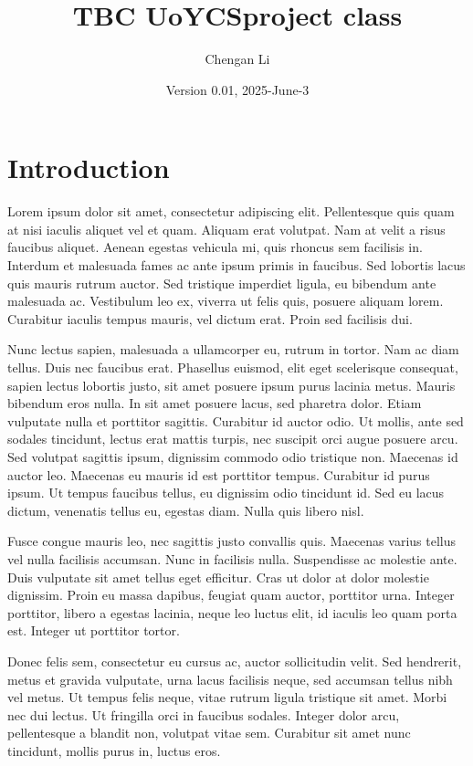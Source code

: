 \documentclass{UoYCSproject}
\author{Chengan Li}
\title{TBC
\textsf{UoYCSproject} class}
\date{Version 0.01, 2025-June-3}
\begin{document}
\maketitle
\listoffigures
\listoftables


\chapter{Introduction}
\label{cha:Introduction}
Lorem ipsum dolor sit amet, consectetur adipiscing elit. Pellentesque
quis quam at nisi iaculis aliquet vel et quam. Aliquam erat
volutpat. Nam at velit a risus faucibus aliquet. Aenean egestas
vehicula mi, quis rhoncus sem facilisis in. Interdum et malesuada
fames ac ante ipsum primis in faucibus. Sed lobortis lacus quis mauris
rutrum auctor. Sed tristique imperdiet ligula, eu bibendum ante
malesuada ac. Vestibulum leo ex, viverra ut felis quis, posuere
aliquam lorem. Curabitur iaculis tempus mauris, vel dictum erat. Proin
sed facilisis dui.

Nunc lectus sapien, malesuada a ullamcorper eu, rutrum in tortor. Nam
ac diam tellus. Duis nec faucibus erat. Phasellus euismod, elit eget
scelerisque consequat, sapien lectus lobortis justo, sit amet posuere
ipsum purus lacinia metus. Mauris bibendum eros nulla. In sit amet
posuere lacus, sed pharetra dolor. Etiam vulputate nulla et porttitor
sagittis. Curabitur id auctor odio. Ut mollis, ante sed sodales
tincidunt, lectus erat mattis turpis, nec suscipit orci augue posuere
arcu. Sed volutpat sagittis ipsum, dignissim commodo odio tristique
non. Maecenas id auctor leo. Maecenas eu mauris id est porttitor
tempus. Curabitur id purus ipsum. Ut tempus faucibus tellus, eu
dignissim odio tincidunt id. Sed eu lacus dictum, venenatis tellus eu,
egestas diam. Nulla quis libero nisl.

Fusce congue mauris leo, nec sagittis justo convallis quis. Maecenas
varius tellus vel nulla facilisis accumsan. Nunc in facilisis
nulla. Suspendisse ac molestie ante. Duis vulputate sit amet tellus
eget efficitur. Cras ut dolor at dolor molestie dignissim. Proin eu
massa dapibus, feugiat quam auctor, porttitor urna. Integer porttitor,
libero a egestas lacinia, neque leo luctus elit, id iaculis leo quam
porta est. Integer ut porttitor tortor.

Donec felis sem, consectetur eu cursus ac, auctor sollicitudin
velit. Sed hendrerit, metus et gravida vulputate, urna lacus facilisis
neque, sed accumsan tellus nibh vel metus. Ut tempus felis neque,
vitae rutrum ligula tristique sit amet. Morbi nec dui lectus. Ut
fringilla orci in faucibus sodales. Integer dolor arcu, pellentesque a
blandit non, volutpat vitae sem. Curabitur sit amet nunc tincidunt,
mollis purus in, luctus eros.
\end{document}
